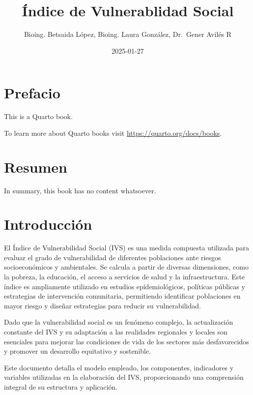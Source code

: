 \documentclass[
  letterpaper,
  DIV=11,
  numbers=noendperiod]{scrreprt}
\title{Índice de Vulnerablidad Social}
\author{Bioing. Betsaida López, Bioing. Laura González, Dr.~Gener Avilés
R}
\date{2025-01-27}
\renewcommand*\contentsname{Table of contents}
\newcommand\contentsname{Table of contents}
\begin{document}
\maketitle

\renewcommand*\contentsname{Table of contents}
{
\hypersetup{linkcolor=}
\setcounter{tocdepth}{2}
\tableofcontents
}


\chapter*{Prefacio}\label{prefacio}


This is a Quarto book.

To learn more about Quarto books visit
\url{https://quarto.org/docs/books}.


\chapter{Resumen}\label{resumen}

In summary, this book has no content whatsoever.


\chapter{Introducción}\label{introducciuxf3n}

El Índice de Vulnerabilidad Social (IVS) es una medida compuesta
utilizada para evaluar el grado de vulnerabilidad de diferentes
poblaciones ante riesgos socioeconómicos y ambientales. Se calcula a
partir de diversas dimensiones, como la pobreza, la educación, el acceso
a servicios de salud y la infraestructura. Este índice es ampliamente
utilizado en estudios epidemiológicos, políticas públicas y estrategias
de intervención comunitaria, permitiendo identificar poblaciones en
mayor riesgo y diseñar estrategias para reducir su vulnerabilidad.

Dado que la vulnerabilidad social es un fenómeno complejo, la
actualización constante del IVS y su adaptación a las realidades
regionales y locales son esenciales para mejorar las condiciones de vida
de los sectores más desfavorecidos y promover un desarrollo equitativo y
sostenible.

Este documento detalla el modelo empleado, los componentes, indicadores
y variables utilizadas en la elaboración del IVS, proporcionando una
comprensión integral de su estructura y aplicación.
\end{document}
